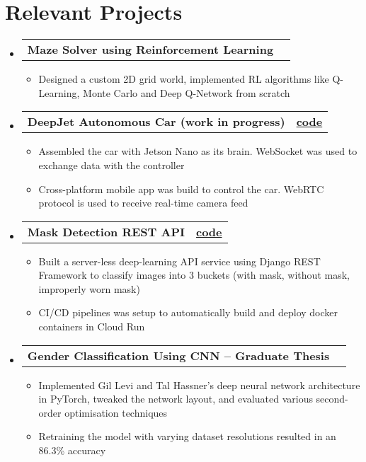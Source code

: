 \documentclass[letterpaper,10pt]{article}
\makeatletter
\newcommand{\resumeItemClean}[1]{
    \item\small{
        {#1 \vspace{-2pt}}
    }
}
\newcommand{\projectheading}[3]{
    \vspace{-1pt}\item
        \begin{tabular*}{0.97\textwidth}{l@{\extracolsep{\fill}}r}
            \textbf{#1} & \textbf{#2} #3\\
    \end{tabular*}\vspace{-5pt}
}
\newcommand{\resumeSubHeadingListStart}{\begin{itemize}[leftmargin=*]}
\newcommand{\resumeSubHeadingListEnd}{\end{itemize}}
\newcommand{\resumeItemListStart}{\begin{itemize}}
\newcommand{\resumeItemListEnd}{\end{itemize}\vspace{-5pt}}
\makeatother
\begin{document}
\section{Relevant Projects}
    \resumeSubHeadingListStart
        \projectheading{Maze Solver using Reinforcement Learning}{}{}{}
            \resumeItemListStart
                \resumeItemClean
                    {Designed a custom 2D grid world, implemented RL algorithms like Q-Learning, Monte Carlo and Deep Q-Network from scratch}
            \resumeItemListEnd
        \projectheading{DeepJet Autonomous Car (work in progress)}{\href{https://github.com/vinaykudari/eureka-bot}{code}}{}
            \resumeItemListStart
                \resumeItemClean
                    {Assembled the car with Jetson Nano as its brain. WebSocket was used to exchange data with the controller}
                \resumeItemClean
                    {Cross-platform mobile app was build to control the car. WebRTC protocol is used to receive real-time camera feed}
            \resumeItemListEnd
        \projectheading{Mask Detection REST API}{\href{https://github.com/vinaykudari/mask-detection-api}{code}}{}
            \resumeItemListStart
                \resumeItemClean
                    {Built a server-less deep-learning API service using Django REST Framework to classify images into 3 buckets (with mask, without mask, improperly worn mask)}
                \resumeItemClean
                    {CI/CD pipelines was setup to automatically build and deploy docker containers in Cloud Run}
            \resumeItemListEnd
        \projectheading{Gender Classification Using CNN -- Graduate Thesis}{}{}{}
            \resumeItemListStart
                \resumeItemClean
                    {Implemented Gil Levi and Tal Hassner's deep neural network architecture in PyTorch, tweaked the network layout, and evaluated various second-order optimisation techniques}
                \resumeItemClean
                    {Retraining the model with varying dataset resolutions resulted in an 86.3\% accuracy}
            \resumeItemListEnd
        
    \resumeSubHeadingListEnd
    
\end{document}
